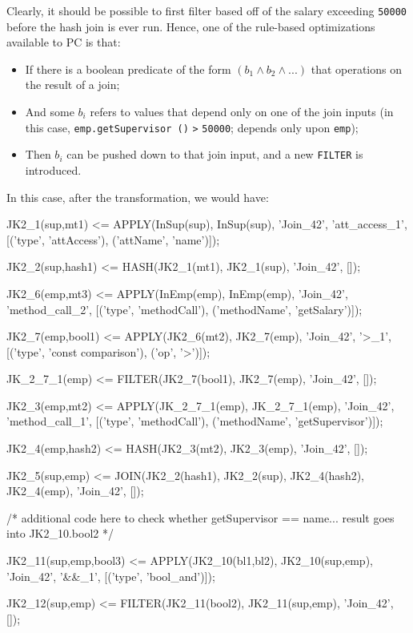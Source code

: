 Clearly, it should be possible to first filter based off of the salary exceeding \texttt{50000} before the hash join is ever run.  Hence, one of
the rule-based optimizations available to PC is that:

\begin{itemize}

\item If there is a boolean predicate of the form $(b_1 \wedge b_2 \wedge ...)$ that operations
on the result of a join;

\item And some $b_i$ refers to values that depend only on one of the join inputs (in this case, \texttt{emp.getSupervisor ()}
\texttt{>} \texttt{50000};
depends only upon \texttt{emp});

\item Then $b_i$ can be pushed down to that join input, and a new
  \texttt{FILTER} is introduced.
\end{itemize}

\noindent In this case, after the transformation, we would have:

\begin{codesmall}
JK2_1(sup,mt1) <= APPLY(InSup(sup), 
   InSup(sup), 'Join_42', 'att_access_1', 
  [('type', 'attAccess'), ('attName', 'name')]);

JK2_2(sup,hash1) <= HASH(JK2_1(mt1), 
   JK2_1(sup), 'Join_42', []);

JK2_6(emp,mt3) <= APPLY(InEmp(emp), 
   InEmp(emp), 'Join_42', 'method_call_2', 
  [('type', 'methodCall'), ('methodName', 'getSalary')]);

JK2_7(emp,bool1) <= APPLY(JK2_6(mt2),
   JK2_7(emp), 'Join_42', '>_1', 
  [('type', 'const comparison'), ('op', '>')]);

JK_2_7_1(emp) <= FILTER(JK2_7(bool1),
   JK2_7(emp), 'Join_42', []);

JK2_3(emp,mt2) <= APPLY(JK_2_7_1(emp), 
   JK_2_7_1(emp), 'Join_42', 'method_call_1', 
  [('type', 'methodCall'), ('methodName', 'getSupervisor')]);

JK2_4(emp,hash2) <= HASH(JK2_3(mt2), 
   JK2_3(emp), 'Join_42', []);

JK2_5(sup,emp) <= JOIN(JK2_2(hash1),
   JK2_2(sup), JK2_4(hash2), 
  JK2_4(emp), 'Join_42', []);

/* additional code here to check whether 
     getSupervisor == name... 
       result goes into JK2_10.bool2 */

JK2_11(sup,emp,bool3) <= APPLY(JK2_10(bl1,bl2), 
   JK2_10(sup,emp), 'Join_42', '&&_1', 
  [('type', 'bool_and')]);

JK2_12(sup,emp) <= FILTER(JK2_11(bool2), 
  JK2_11(sup,emp), 'Join_42', []);
\end{codesmall}
